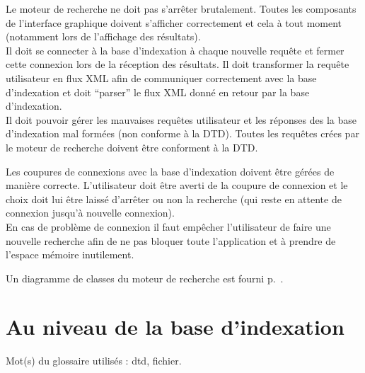 \documentclass[a4paper,12pt]{report}
\begin{document}
Le moteur de recherche ne doit pas s'arrêter brutalement. Toutes les composants de l'interface graphique doivent s'afficher correctement et cela à tout moment (notamment lors de l'affichage des résultats).\\
Il doit se connecter à la base d'indexation à chaque nouvelle requête et fermer cette connexion lors de la réception des résultats. Il doit transformer la requête utilisateur en flux XML afin de communiquer correctement avec la base d'indexation et doit \enquote{parser} le flux XML donné  en retour par la base d'indexation.\\
Il doit pouvoir gérer les mauvaises requêtes utilisateur et les réponses des la base d'indexation mal formées (non conforme à la DTD). Toutes les requêtes crées par le moteur de recherche doivent être conforment à la DTD.

Les coupures de connexions avec la base d'indexation doivent être gérées de manière correcte. L'utilisateur doit être averti de la coupure de connexion et le choix doit lui être laissé d'arrêter ou non la recherche (qui reste en attente de connexion jusqu'à nouvelle connexion).\\
En cas de problème de connexion il faut empêcher l'utilisateur de faire une nouvelle recherche afin de ne pas bloquer toute l'application et à prendre de l'espace mémoire inutilement.

Un diagramme de classes du moteur de recherche est fourni p.~\pageref{diagramme_classes_mr}.

\section{Au niveau de la base d'indexation}
Mot(s) du glossaire utilisés : \gls{dtd}, \gls{fichier}.
\end{document}
